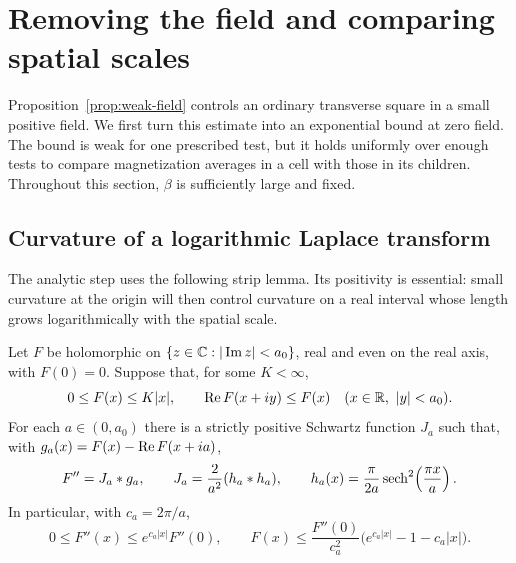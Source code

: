 \section{Removing the field and comparing spatial scales}
\label{sec:zero-field}

Proposition~\ref{prop:weak-field} controls an ordinary transverse square in
a small positive field.  We first turn this estimate into an exponential
bound at zero field.  The bound is weak for one prescribed test, but it
holds uniformly over enough tests to compare magnetization averages in a
cell with those in its children.  Throughout this section, $\beta$ is
sufficiently large and fixed.

\subsection{Curvature of a logarithmic Laplace transform}

The analytic step uses the following strip lemma.  Its positivity is
essential: small curvature at the origin will then control curvature on
a real interval whose length grows logarithmically with the spatial
scale.

\begin{lemma}\label{lem:strip-curvature}
Let $F$ be holomorphic on $\{z\in\mathbb C:|\operatorname{Im} z|<a_0\}$, real and even on
the real axis, with $F(0)=0$.  Suppose that, for some $K<\infty$,
\[
  0\le F(x)\le K|x|,
  \qquad \operatorname{Re} F(x+iy)\le F(x)
  \quad(x\in\mathbb R,\ |y|<a_0).
\]
For each $a\in(0,a_0)$ there is a strictly positive Schwartz function
$J_a$ such that, with $g_a(x)=F(x)-\operatorname{Re} F(x+ia)$,
\begin{equation}\label{eq:strip-convolution}
 F''=J_a*g_a,
 \qquad
 J_a=\frac{2}{a^2}(h_a*h_a),
 \qquad
 h_a(x)=\frac{\pi}{2a}\operatorname{sech}^2\!\left(\frac{\pi x}{a}\right).
\end{equation}
In particular, with $c_a=2\pi/a$,
\begin{equation}\label{eq:strip-curvature-growth}
  0\le F''(x)\le e^{c_a|x|}F''(0),
  \qquad
  F(x)\le \frac{F''(0)}{c_a^2}
       \bigl(e^{c_a|x|}-1-c_a|x|\bigr).
\end{equation}
\end{lemma}

